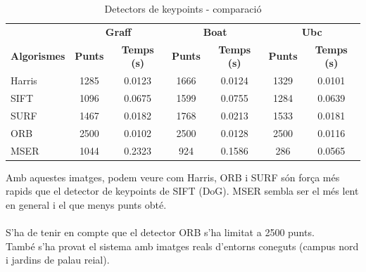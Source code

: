 		\begin{table}[H]
			\begin{center}
				\begin{tabular}{l | c c | c c | c c}
					& \multicolumn{2}{c|}{\textbf{Graff}} & \multicolumn{2}{c|}{\textbf{Boat}} & \multicolumn{2}{c}{\textbf{Ubc}} \\
					\textbf{Algorismes} & \textbf{Punts} & \textbf{Temps (s)} & \textbf{Punts} & \textbf{Temps (s)} & \textbf{Punts} & \textbf{Temps (s)} \\ \hline
					Harris & 1285 & 0.0123 & 1666 & 0.0124 & 1329 & 0.0101 \\
					SIFT & 1096 & 0.0675 & 1599 & 0.0755 & 1284 & 0.0639 \\
					SURF & 1467 & 0.0182 & 1768 & 0.0213 & 1533 & 0.0181 \\
					ORB & 2500 & 0.0102 & 2500 & 0.0128 & 2500 & 0.0116 \\
					MSER & 1044 & 0.2323 & 924 & 0.1586 & 286 & 0.0565 \\
				\end{tabular}
			\end{center}
			\caption{Detectors de keypoints - comparació}
		\end{table}
		\noindent
		Amb aquestes imatges, podem veure com Harris, ORB i SURF són força més rapids que el detector de keypoints de SIFT (DoG). MSER sembla ser el més lent en general i el que menys punts obté.\\\\
		S'ha de tenir en compte que el detector ORB s'ha limitat a 2500 punts.\\
\newpage
		\noindent
		També s'ha provat el sistema amb imatges reals d'entorns coneguts (campus nord i jardins de palau reial).

